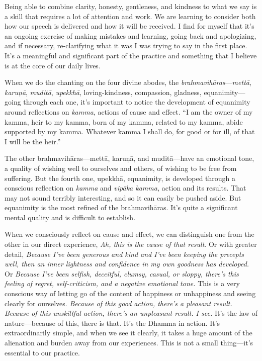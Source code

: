 Being able to combine clarity, honesty, gentleness, and kindness to 
what we say is a skill that requires a lot of attention and work. We 
are learning to consider both how our speech is delivered and how it 
will be received. I find for myself that it's an ongoing exercise of 
making mistakes and learning, going back and apologizing, and if 
necessary, re-clarifying what it was I was trying to say in the first 
place. It's a meaningful and significant part of the practice and 
something that I believe is at the core of our daily lives.


When we do the chanting on the four divine abodes, the 
\emph{brahmavihāras}---\emph{mettā}, \emph{karuṇā}, 
\emph{muditā}, \emph{upekkhā}, loving-kindness, compassion, gladness, 
equanimity---going through each one, it's important to notice the 
development of equanimity around reflections on \emph{kamma}, actions 
of cause and effect. ``I am the owner of my kamma, heir to my kamma, 
born of my kamma, related to my kamma, abide supported by my kamma. 
Whatever kamma I shall do, for good or for ill, of that I will be the 
heir.''

The other brahmavihāras---mettā, karuṇā, and muditā---have an 
emotional tone, a quality of wishing well to ourselves and others, of 
wishing to be free from suffering. But the fourth one, upekkhā, 
equanimity, is developed through a conscious reflection on \emph{kamma} 
and \emph{vipāka kamma,} action and its results. That may not sound 
terribly interesting, and so it can easily be pushed aside. But 
equanimity is the most refined of the brahmavihāras. It's quite a 
significant mental quality and is difficult to establish.

When we consciously reflect on cause and effect, we can distinguish one 
from the other in our direct experience, \emph{Ah, this is the cause of 
that result}. Or with greater detail, \emph{Because I've been generous 
and kind and I've been keeping the precepts well, then an inner 
lightness and confidence in my own goodness has developed.} Or 
\emph{Because I've been selfish, deceitful, clumsy, casual, or sloppy, 
there's this feeling of regret, self-criticism, and a negative 
emotional tone.} This is a very conscious way of letting go of the 
content of happiness or unhappiness and seeing clearly for ourselves. 
\emph{Because of this good action, there's a pleasant result. Because 
of this unskillful action, there's an unpleasant result. I see.} It's 
the law of nature---because of this, there is that. It's the Dhamma in 
action. It's extraordinarily simple, and when we see it clearly, it 
takes a huge amount of the alienation and burden away from our 
experiences. This is not a small thing---it's essential to our practice.

